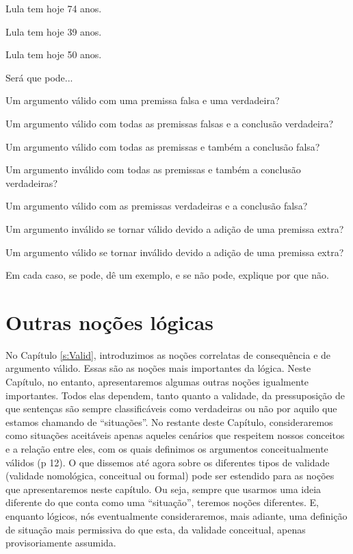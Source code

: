 \begin{earg}
\item Lula tem hoje 74 anos.
\item Lula tem hoje 39 anos.
\item[\therefore] Lula tem hoje 50 anos.
\end{earg}

\problempart
\label{pr.EnglishCombinations}
Será que pode...
	\begin{earg}
		\item Um argumento válido com uma premissa falsa e uma verdadeira?
		\item Um argumento válido com todas as premissas falsas e a conclusão verdadeira?
		\item Um argumento válido com todas as premissas e também a conclusão falsa?
		\item Um argumento inválido com todas as premissas e também a conclusão verdadeiras?
		\item Um argumento válido com as premissas verdadeiras e a conclusão falsa?
		\item Um argumento inválido se tornar válido devido a adição de uma premissa extra?
		\item Um argumento válido se tornar inválido devido a adição de uma premissa extra?
	\end{earg}
Em cada caso, se pode, dê um exemplo, e se não pode, explique por que não.




\chapter{Outras noções lógicas}\label{s:BasicNotions}

No Capítulo \ref{s:Valid}, introduzimos as noções correlatas de consequência e de argumento válido.
Essas são as noções mais importantes da lógica.
Neste Capítulo, no entanto, apresentaremos algumas outras noções igualmente importantes.
Todos elas dependem, tanto quanto a validade, da pressuposição de que sentenças são sempre classificáveis como  verdadeiras ou não por aquilo que estamos chamando de ``situações''.
No restante deste Capítulo, consideraremos como situações aceitáveis apenas aqueles cenários que respeitem nossos conceitos e a relação entre eles, com os quais definimos os argumentos conceitualmente válidos (p 12).
O que dissemos até agora sobre os diferentes tipos de validade (validade nomológica, conceitual ou formal) pode ser estendido para as noções que apresentaremos neste capítulo. Ou seja, sempre que usarmos uma ideia diferente do que conta como uma ``situação'', teremos noções diferentes.
E, enquanto lógicos, nós eventualmente consideraremos, mais adiante, uma definição de situação mais permissiva do que esta, da validade conceitual, apenas provisoriamente assumida.

